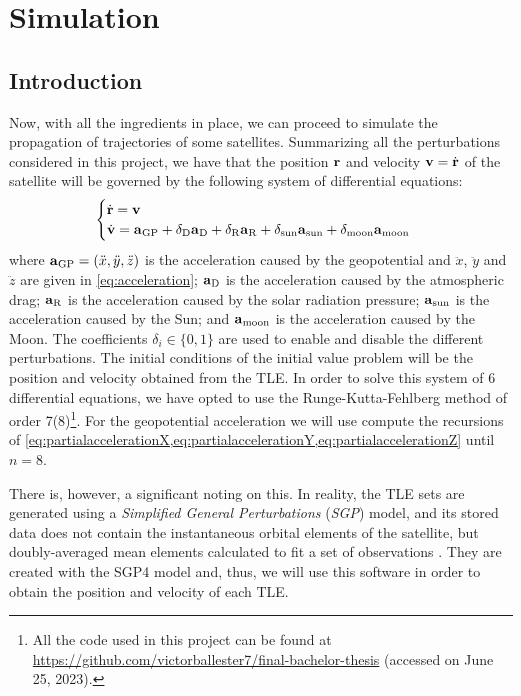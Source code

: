 \documentclass[../main.tex]{subfiles}
\begin{document}
\section{Simulation}\label{sec:simulation}
\subsection{Introduction}
Now, with all the ingredients in place, we can proceed to simulate the propagation of trajectories of some satellites.
Summarizing all the perturbations considered in this project, we have that the position $\boldsymbol{\mathrm{r}}$ and velocity $\boldsymbol{\mathrm{v}}=\dot{\boldsymbol{\mathrm{r}}}$ of the satellite will be governed by the following system of differential equations:
\begin{equation}
  \begin{cases}
    \dot{\boldsymbol{\mathrm{r}}}=\boldsymbol{\mathrm{v}} \\
    \dot{\boldsymbol{\mathrm{v}}}=\boldsymbol{\mathrm{a}}_{\mathrm{GP}} + \delta_{\mathrm{D}}\boldsymbol{\mathrm{a}}_{\mathrm{D}}+\delta_{\mathrm{R}}\boldsymbol{\mathrm{a}}_{\mathrm{R}}+\delta_{\mathrm{sun}}\boldsymbol{\mathrm{a}}_{\mathrm{sun}}+\delta_{\mathrm{moon}}\boldsymbol{\mathrm{a}}_\mathrm{moon}
  \end{cases}
\end{equation}
where $\boldsymbol{\mathrm{a}}_{\mathrm{GP}}=(\ddot{x},\ddot{y},\ddot{z})$ is the acceleration caused by the geopotential and $\ddot{x}$, $\ddot{y}$ and $\ddot{z}$ are given in \cref{eq:acceleration}; $\boldsymbol{\mathrm{a}}_{\mathrm{D}}$ is the acceleration caused by the atmospheric drag; $\boldsymbol{\mathrm{a}}_{\mathrm{R}}$ is the acceleration caused by the solar radiation pressure; $\boldsymbol{\mathrm{a}}_{\mathrm{sun}}$ is the acceleration caused by the Sun; and $\boldsymbol{\mathrm{a}}_{\mathrm{moon}}$ is the acceleration caused by the Moon. The coefficients $\delta_{i}\in\{0,1\}$ are used to enable and disable the different perturbations. The initial conditions of the initial value problem will be the position and velocity obtained from the TLE. In order to solve this system of 6 differential equations, we have opted to use the Runge-Kutta-Fehlberg method of order 7(8)\footnote{All the code used in this project can be found at \url{https://github.com/victorballester7/final-bachelor-thesis} (accessed on June 25, 2023).}. For the geopotential acceleration we will use compute the recursions of \cref{eq:partialaccelerationX,eq:partialaccelerationY,eq:partialaccelerationZ} until $n=8$.

There is, however, a significant noting on this. In reality, the TLE sets are generated using a \emph{Simplified General Perturbations} (\emph{SGP}) model, and its stored data does not contain the instantaneous orbital elements of the satellite, but doubly-averaged mean elements calculated to fit a set of observations \cite{celestrak,celestrakReport}.
They are created with the SGP4 model and, thus, we will use this software in order to obtain the position and velocity of each TLE.
\end{document}
